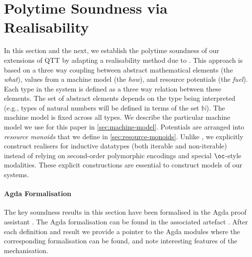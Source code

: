 \documentclass[acmsmall,screen]{acmart}
\begin{document}
\section{Polytime Soundness via Realisability}
\label{sec:soundness}

\newcommand{\cstaccess}{1}
\newcommand{\cstmkclo}{1}
\newcommand{\cstapp}{1}
\newcommand{\cstmkpair}{1}
\newcommand{\cstmkunit}{1}
\newcommand{\cstTrue}{1}
\newcommand{\cstFalse}{1}
\newcommand{\cstLetpair}{1}
\newcommand{\cstSeq}{1}
\newcommand{\cstIf}{1}

\newcommand{\clo}[2]{\mathsf{clo}\langle #1 , #2 \rangle}
\newcommand{\synTrue}{\mathsf{true}}
\newcommand{\synFalse}{\mathsf{false}}

\newcommand{\ExpSet}{\mathcal{E}}
\newcommand{\ValSet}{\mathcal{V}}

\newcommand{\rplus}{\oplus}
\newcommand{\rzero}{\emptyset}

In this section and the next, we establish the polytime soundness of
our extensions of QTT by adapting a realisability method due to
\citet{dallago11realisability}. This approach is based on a three way
coupling between abstract mathematical elements (the \emph{what}),
values from a machine model (the \emph{how}), and resource potentials
(the \emph{fuel}). Each type in the system is defined as a three way
relation between these elements. The set of abstract elements depends
on the type being interpreted (e.g., types of natural numbers will be
defined in terms of the set $\mathbb{N}$). The machine model is fixed
across all types. We describe the particular machine model we use for
this paper in \autoref{sec:machine-model}. Potentials are arranged
into \emph{resource monoids} that we define in
\autoref{sec:resource-monoids}. Unlike \citet{dallago11realisability},
we explicitly construct realisers for inductive datatypes (both
iterable and non-iterable) instead of relying on second-order
polymorphic encodings and special $\oc$-style modalities. These
explicit constructions are essential to construct models of our systems.

\paragraph{Agda Formalisation} The key soundness results in this
section have been formalised in the Agda proof assistant
\cite{norell2008dependently}. The Agda formalisation can be found in
the associated artefact \cite{atkey2023polydep-artefact}. After each
definition and result we provide a pointer to the Agda modules where
the corresponding formalisation can be found, and note interesting
features of the mechanisation.
\end{document}
